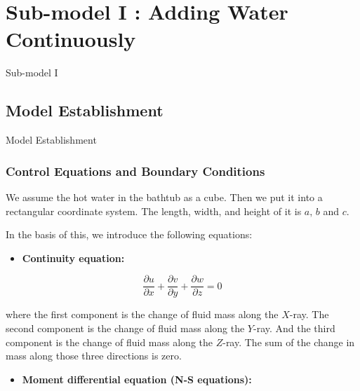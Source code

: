 \documentclass{mcmthesis}
\begin{document}
\section{Sub-model I : Adding Water Continuously}
Sub-model I 

\subsection{Model Establishment}
Model Establishment 

\subsubsection{Control Equations and Boundary Conditions}
We assume the hot water in the bathtub as a cube. Then we put it into a
rectangular coordinate system. The length, width, and height of it is $a,\, b$ 
and $c$.


In the basis of this, we introduce the following equations:

\begin{itemize}
\item {\bf Continuity equation:}
\end{itemize}

\begin{equation} \label{eq1}        %
\frac{\partial u}{\partial x} + \frac{\partial v}{\partial y} +
\frac{\partial w}{\partial z} = 0   %
\end{equation}
    
\noindent where the first component is the change of fluid mass along the $X$-ray. 
The second component is the change of fluid mass along the $Y$-ray. And the third 
component is the change of fluid mass along the $Z$-ray. The sum of the change in 
mass along those three directions is zero.

\begin{itemize}
\item {\bf Moment differential equation (N-S equations):}
\end{itemize}
\end{document}
